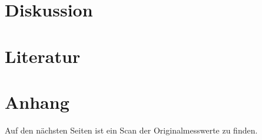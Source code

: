 \section{Diskussion}
\label{sec:diskussion}


\section{Literatur}
\label{sec:literatur}

\section{Anhang}
\label{sec:Anhang}
Auf den nächsten Seiten ist ein Scan der Originalmesswerte zu finden.